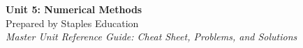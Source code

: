 




\begin{center}
    {\LARGE \bfseries Unit 5: Numerical Methods}\\[6pt]
    {\large Prepared by Staples Education}\\[4pt]
    {\itshape Master Unit Reference Guide: Cheat Sheet, Problems, and Solutions}
\end{center}

\vspace{0.4em}

\tableofcontents

\vspace{0.4em}

